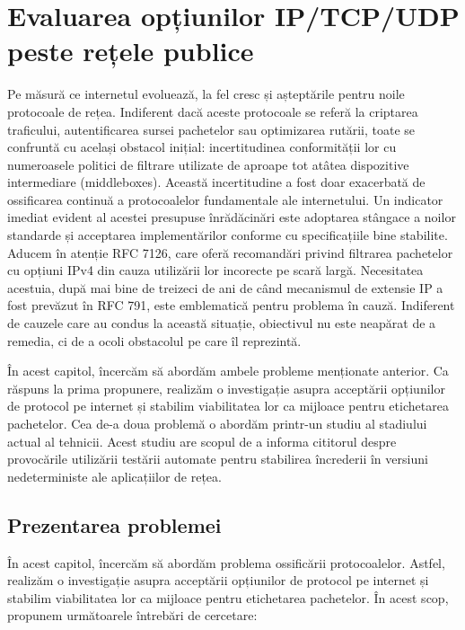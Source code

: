 \chapter{Evaluarea opțiunilor IP/TCP/UDP peste rețele publice}

Pe măsură ce internetul evoluează, la fel cresc și așteptările pentru noile protocoale de rețea. Indiferent dacă aceste protocoale se referă la criptarea traficului, autentificarea sursei pachetelor sau optimizarea rutării, toate se confruntă cu același obstacol inițial: incertitudinea conformității lor cu numeroasele politici de filtrare utilizate de aproape tot atâtea dispozitive intermediare (middleboxes). Această incertitudine a fost doar exacerbată de ossificarea continuă a protocoalelor fundamentale ale internetului. Un indicator imediat evident al acestei presupuse înrădăcinări este adoptarea stângace a noilor standarde și acceptarea implementărilor conforme cu specificațiile bine stabilite. Aducem în atenție RFC 7126, care oferă recomandări privind filtrarea pachetelor cu opțiuni IPv4 din cauza utilizării lor incorecte pe scară largă. Necesitatea acestuia, după mai bine de treizeci de ani de când mecanismul de extensie IP a fost prevăzut în RFC 791, este emblematică pentru problema în cauză. Indiferent de cauzele care au condus la această situație, obiectivul nu este neapărat de a remedia, ci de a ocoli obstacolul pe care îl reprezintă.

În acest capitol, încercăm să abordăm ambele probleme menționate anterior. Ca răspuns la prima propunere, realizăm o investigație asupra acceptării opțiunilor de protocol pe internet și stabilim viabilitatea lor ca mijloace pentru etichetarea pachetelor. Cea de-a doua problemă o abordăm printr-un studiu al stadiului actual al tehnicii. Acest studiu are scopul de a informa cititorul despre provocările utilizării testării automate pentru stabilirea încrederii în versiuni nedeterministe ale aplicațiilor de rețea.

\section{Prezentarea problemei}

În acest capitol, încercăm să abordăm problema ossificării protocoalelor. Astfel, realizăm o investigație asupra acceptării opțiunilor de protocol pe internet și stabilim viabilitatea lor ca mijloace pentru etichetarea pachetelor. În acest scop, propunem următoarele întrebări de cercetare:


